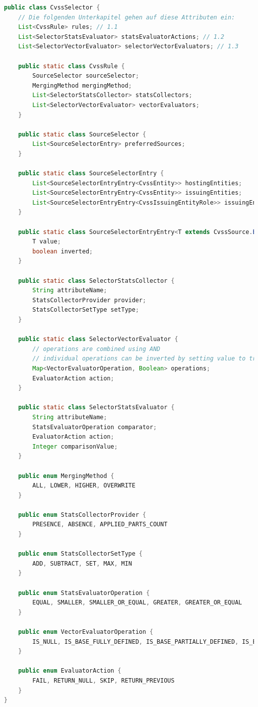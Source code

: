 \begin{lstlisting}[language=Java, label={lst:cvss-selector-class-attributes}, caption={CVSS-Selektor Klassen}]
public class CvssSelector {
    // Die folgenden Unterkapitel gehen auf diese Attributen ein:
    List<CvssRule> rules; // 1.1
    List<SelectorStatsEvaluator> statsEvaluatorActions; // 1.2
    List<SelectorVectorEvaluator> selectorVectorEvaluators; // 1.3

    public static class CvssRule {
        SourceSelector sourceSelector;
        MergingMethod mergingMethod;
        List<SelectorStatsCollector> statsCollectors;
        List<SelectorVectorEvaluator> vectorEvaluators;
    }

    public static class SourceSelector {
        List<SourceSelectorEntry> preferredSources;
    }

    public static class SourceSelectorEntry {
        List<SourceSelectorEntryEntry<CvssEntity>> hostingEntities;
        List<SourceSelectorEntryEntry<CvssEntity>> issuingEntities;
        List<SourceSelectorEntryEntry<CvssIssuingEntityRole>> issuingEntityRoles;
    }

    public static class SourceSelectorEntryEntry<T extends CvssSource.EntityNameProvider> {
        T value;
        boolean inverted;
    }

    public static class SelectorStatsCollector {
        String attributeName;
        StatsCollectorProvider provider;
        StatsCollectorSetType setType;
    }

    public static class SelectorVectorEvaluator {
        // operations are combined using AND
        // individual operations can be inverted by setting value to true
        Map<VectorEvaluatorOperation, Boolean> operations;
        EvaluatorAction action;
    }

    public static class SelectorStatsEvaluator {
        String attributeName;
        StatsEvaluatorOperation comparator;
        EvaluatorAction action;
        Integer comparisonValue;
    }

    public enum MergingMethod {
        ALL, LOWER, HIGHER, OVERWRITE
    }

    public enum StatsCollectorProvider {
        PRESENCE, ABSENCE, APPLIED_PARTS_COUNT
    }

    public enum StatsCollectorSetType {
        ADD, SUBTRACT, SET, MAX, MIN
    }

    public enum StatsEvaluatorOperation {
        EQUAL, SMALLER, SMALLER_OR_EQUAL, GREATER, GREATER_OR_EQUAL
    }

    public enum VectorEvaluatorOperation {
        IS_NULL, IS_BASE_FULLY_DEFINED, IS_BASE_PARTIALLY_DEFINED, IS_ENVIRONMENTAL_PARTIALLY_DEFINED, IS_TEMPORAL_PARTIALLY_DEFINED, IS_THREAT_PARTIALLY_DEFINED
    }

    public enum EvaluatorAction {
        FAIL, RETURN_NULL, SKIP, RETURN_PREVIOUS
    }
}
\end{lstlisting}

